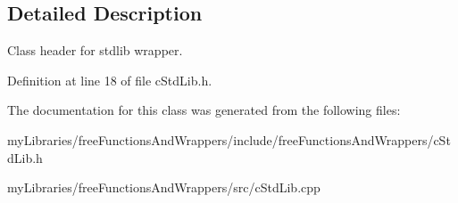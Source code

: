 \subsection{Detailed Description}
Class header for stdlib wrapper. 

Definition at line 18 of file c\+Std\+Lib.\+h.



The documentation for this class was generated from the following files\+:\begin{DoxyCompactItemize}
\item 
my\+Libraries/free\+Functions\+And\+Wrappers/include/free\+Functions\+And\+Wrappers/c\+Std\+Lib.\+h\item 
my\+Libraries/free\+Functions\+And\+Wrappers/src/c\+Std\+Lib.\+cpp\end{DoxyCompactItemize}
